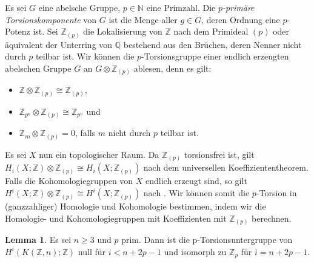 \documentclass[11pt, a4paper, german]{article}
\theoremstyle{definition}
\newtheorem{lem}{Lemma}
\theoremstyle{remark}
\newcommand{\N}{\mathbb{N}} %
\newcommand{\Z}{\mathbb{Z}} %
\newcommand{\Q}{\mathbb{Q}} %
\begin{document}

Es sei $G$ eine abelsche Gruppe, $p \in \N$ eine Primzahl.
Die \emph{$p$-primäre Torsionskomponente} von $G$ ist die Menge aller $g \in G$, deren Ordnung eine $p$-Potenz ist.
Sei $\Z_{(p)}$ die Lokalisierung von $\Z$ nach dem Primideal $(p)$ oder äquivalent der Unterring von $\Q$ bestehend aus den Brüchen, deren Nenner nicht durch $p$ teilbar ist.
Wir können die $p$-Torsionsgruppe einer endlich erzeugten abelschen Gruppe $G$ an $G \otimes \Z_{(p)}$ ablesen, denn es gilt:
\begin{itemize}
  \item $\Z \otimes \Z_{(p)} \cong \Z_{(p)}$,
  \item $\Z_{p^n} \otimes \Z_{(p)} \cong \Z_{p^n}$ und
  \item $\Z_m \otimes \Z_{(p)} = 0$, falls $m$ nicht durch $p$ teilbar ist.
\end{itemize}

Es sei $X$ nun ein topologischer Raum.
Da $\Z_{(p)}$ torsionsfrei ist, gilt
$H_i(X; \Z) \otimes \Z_{(p)} \cong H_i(X; \Z_{(p)})$ nach dem universellen Koeffiziententheorem.
Falls die Kohomologiegruppen von $X$ endlich erzeugt sind, so gilt
$H^i(X; \Z) \otimes \Z_{(p)} \cong H^i(X; \Z_{(p)})$
nach \cite[\mbox{} Thm 5.5.10]{spanier:at}.
Wir können somit die $p$-Torsion in (ganzzahliger) Homologie und Kohomologie bestimmen, indem wir die Homologie- und Kohomologiegruppen mit Koeffizienten mit $\Z_{(p)}$ berechnen.

\begin{lem}\label{mod-p-cohomology-kzn}
  Es sei $n \geq 3$ und $p$ prim.
  Dann ist die p-Torsionsuntergruppe von $H^i(K(\Z, n); \Z)$ null für $i < n + 2p - 1$ und isomorph zu $\Z_p$ für $i = n + 2p - 1$.
\end{lem}
\end{document}

